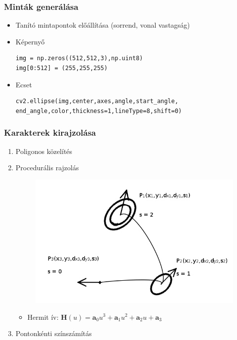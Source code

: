 \documentclass{beamer}
\begin{document}
\begin{frame}[fragile]
\frametitle{Minták generálása}
\begin{itemize}
\item {\large Tanító mintapontok előállítása} (sorrend, vonal vastagság)
\item Képernyő \begin{lstlisting}
img = np.zeros((512,512,3),np.uint8)
img[0:512] = (255,255,255)
\end{lstlisting} 
\item Ecset \begin{lstlisting}
cv2.ellipse(img,center,axes,angle,start_angle,
end_angle,color,thickness=1,lineType=8,shift=0) 
\end{lstlisting}
\end{itemize}


\end{frame}

\begin{frame}[fragile]
\frametitle{Karakterek kirajzolása}
\begin{enumerate}
\item Poligonos közelítés
\item Procedurális rajzolás \begin{figure}
\includegraphics[scale=0.35]{proc_draw2}
\end{figure}
\begin{itemize}
\item Hermit ív: $\textbf{H}(u) = \textbf{a}_0 u^3 + \textbf{a}_1 u^2 + \textbf{a}_2 u + \textbf{a}_3$
\end{itemize}
\item Pontonkénti színszámítás
\end{enumerate}

\end{frame}
\end{document}
